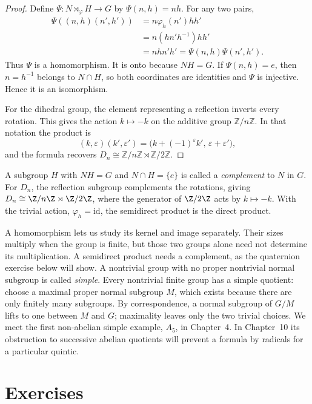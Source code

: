 \begin{proof}
Define $\Psi:N\rtimes_\varphi H\to G$ by
$\Psi(n,h)=nh$. For any two pairs,
\[
\begin{aligned}
\Psi((n,h)(n',h'))
 &=n\varphi_h(n')hh'\\
 &=n(hn'h^{-1})hh'\\
 &=nhn'h'
 =\Psi(n,h)\Psi(n',h').
\end{aligned}
\]
Thus $\Psi$ is a homomorphism. It is onto because $NH=G$.
If $\Psi(n,h)=e$, then $n=h^{-1}$ belongs to $N\cap H$,
so both coordinates are identities and $\Psi$ is injective.
Hence it is an isomorphism.

For the dihedral group, the element representing a reflection
inverts every rotation. This gives the action
$k\mapsto-k$ on the additive group $\mathbb Z/n\mathbb Z$. In that notation the product is
\[
(k,\varepsilon)(k',\varepsilon')=\bigl(k+(-1)^\varepsilon k',\,\varepsilon+\varepsilon'\bigr),
\]
and the formula recovers $D_n\cong\mathbb Z/n\mathbb Z\rtimes\mathbb Z/2\mathbb Z$.
\end{proof}

A subgroup $H$ with $NH=G$ and $N\cap H=\{e\}$ is called a \emph{complement} to $N$ in $G$. For $D_n$, the reflection subgroup complements the rotations, giving $D_n\cong\Z/n\Z\rtimes\Z/2\Z$, where the generator of $\Z/2\Z$ acts by $k\mapsto-k$. With the trivial action, $\varphi_h=\mathrm{id}$, the semidirect product is the direct product.

\begin{beauty}
A homomorphism lets us study its kernel and image separately. Their sizes multiply when the group is finite, but those two groups alone need not determine its multiplication. A semidirect product needs a complement, as the quaternion exercise below will show. A nontrivial group with no proper nontrivial normal subgroup is called \emph{simple}. Every nontrivial finite group has a simple quotient: choose a maximal proper normal subgroup $M$, which exists because there are only finitely many subgroups. By correspondence, a normal subgroup of $G/M$ lifts to one between $M$ and $G$; maximality leaves only the two trivial choices. We meet the first non-abelian simple example, $A_5$, in Chapter~4. In Chapter~10 its obstruction to successive abelian quotients will prevent a formula by radicals for a particular quintic.
\end{beauty}

\section{Exercises}

